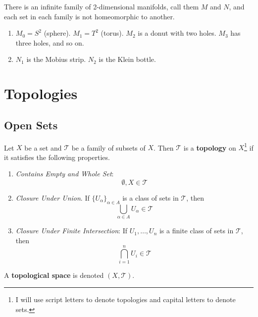 \documentclass{article}
\begin{document}
  \begin{example}
    There is an infinite family of 2-dimensional manifolds, call them $M$ and $N$, and each set in each family is not homeomorphic to another.  
    \begin{enumerate}
      \item $M_0 = S^2$ (sphere). $M_1 = T^2$ (torus). $M_2$ is a donut with two holes. $M_3$ has three holes, and so on. 
      \item $N_1$ is the Mobius strip. $N_2$ is the Klein bottle. 
    \end{enumerate}
  \end{example}

\section{Topologies} 

  \subsection{Open Sets} 

    \begin{definition}[Topology]
      Let $X$ be a set and $\mathscr{T}$ be a family of subsets of $X$. Then $\mathscr{T}$ is a \textbf{topology} on $X$\footnote{I will use script letters to denote topologies and capital letters to denote sets.} if it satisfies the following properties. 
      \begin{enumerate}
        \item \textit{Contains Empty and Whole Set}: 
        \begin{equation}
          \emptyset, X \in \mathscr{T}
        \end{equation}

        \item \textit{Closure Under Union}. If $\{U_\alpha\}_{\alpha \in A}$ is a class of sets in $\mathscr{T}$, then 
        \begin{equation}
          \bigcup_{\alpha \in A} U_\alpha \in \mathscr{T}
        \end{equation}

        \item \textit{Closure Under Finite Intersection}: If $U_1, \ldots, U_n$ is a finite class of sets in $\mathscr{T}$, then 
        \begin{equation}
         \bigcap_{i=1}^{n} U_i \in \mathscr{T}
        \end{equation}
      \end{enumerate}
      A \textbf{topological space} is denoted $(X, \mathscr{T})$. 
    \end{definition}
\end{document}
